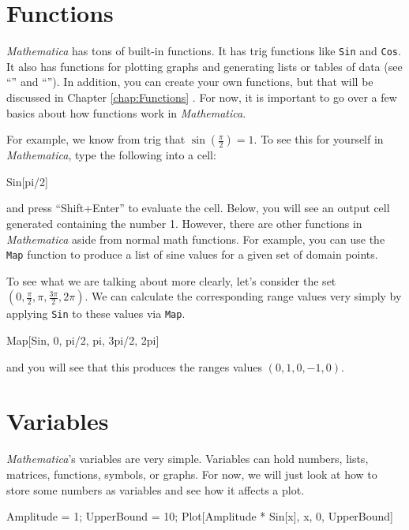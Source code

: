 \section{Functions}
\emph{Mathematica} has tons of built-in functions. It has trig functions like \texttt{Sin} and \texttt{Cos}. It also has functions for plotting graphs and generating lists or tables of data (see ``'' and ``''). In addition, you can create your own functions, but that will be discussed in Chapter \ref{chap:Functions} . For now, it is important to go over a few basics about how functions work in \emph{Mathematica}.

For example, we know from trig that $\sin(\frac{\pi}{2}) = 1$. To see this for yourself in \emph{Mathematica}, type the following into a cell:

\begin{code}
	   Sin[pi/2]
\end{code}
and press ``Shift+Enter'' to evaluate the cell. Below, you will see an output cell generated containing the number 1. However, there are other functions in \emph{Mathematica} aside from normal math functions. For example, you can use the \texttt{Map} function to produce a list of sine values for a given set of domain points. 

To see what we are talking about more clearly, let's consider the set $(0, \frac{\pi}{2}, \pi, \frac{3\pi}{2}, 2\pi)$. We can calculate the corresponding range values very simply by applying \texttt{Sin} to these values via \texttt{Map}.

\begin{code}
	   Map[Sin, {0, pi/2, pi, 3pi/2, 2pi}]
\end{code}
and you will see that this produces the ranges values $(0, 1, 0, -1, 0)$.

\section{Variables}
\emph{Mathematica}'s variables are very simple. Variables can hold numbers, lists, matrices, functions, symbols, or graphs. For now, we will just look at how to store some numbers as variables and see how it affects a plot.

\begin{code}
	   Amplitude = 1;
	   UpperBound = 10;
	   Plot[Amplitude * Sin[x], {x, 0, UpperBound}]
\end{code}

